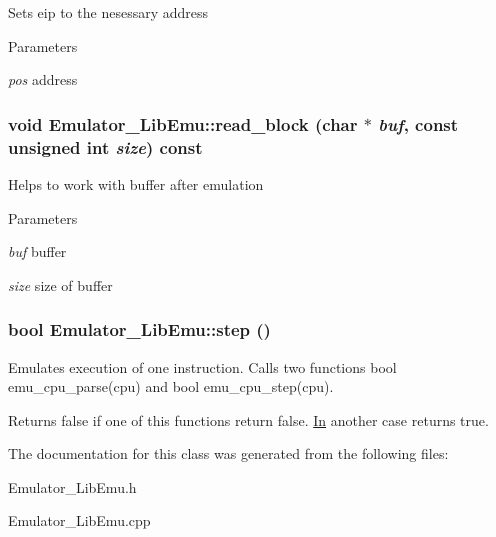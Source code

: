 \label{classEmulator__LibEmu_a998a8239af4107121592764094de152c}
Sets eip to the nesessary address 
\begin{DoxyParams}{Parameters}
\item[{\em pos}]address \end{DoxyParams}
\hypertarget{classEmulator__LibEmu_ab0b54d3e5a0b42ab48da798dc49b3306}{
\subsubsection[{read\_\-block}]{\setlength{\rightskip}{0pt plus 5cm}void Emulator\_\-LibEmu::read\_\-block (char $\ast$ {\em buf}, \/  const unsigned int {\em size}) const}}
\label{classEmulator__LibEmu_ab0b54d3e5a0b42ab48da798dc49b3306}
Helps to work with buffer after emulation 
\begin{DoxyParams}{Parameters}
\item[{\em buf}]buffer \item[{\em size}]size of buffer \end{DoxyParams}
\hypertarget{classEmulator__LibEmu_a2d1424d0a52e51b37788e6186cc1ba9f}{
\subsubsection[{step}]{\setlength{\rightskip}{0pt plus 5cm}bool Emulator\_\-LibEmu::step ()}}
\label{classEmulator__LibEmu_a2d1424d0a52e51b37788e6186cc1ba9f}
Emulates execution of one instruction. Calls two functions bool emu\_\-cpu\_\-parse(cpu) and bool emu\_\-cpu\_\-step(cpu). \begin{DoxyReturn}{Returns}
false if one of this functions return false. \hyperlink{classIn}{In} another case returns true. 
\end{DoxyReturn}


The documentation for this class was generated from the following files:\begin{DoxyCompactItemize}
\item 
Emulator\_\-LibEmu.h\item 
Emulator\_\-LibEmu.cpp\end{DoxyCompactItemize}
